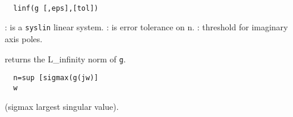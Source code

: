 \begin{mandesc}
   \\ %
\end{mandesc}
\begin{calling_sequence}
\begin{verbatim}
  linf(g [,eps],[tol])   
\end{verbatim}
\end{calling_sequence}
\begin{parameters}
  \begin{varlist}
    : is a \verb!syslin! linear system.
    : is error tolerance on n.
    : threshold for imaginary axis poles.
  \end{varlist}
\end{parameters}
\begin{mandescription}
  returns the L\_infinity norm of \verb!g!.
\begin{verbatim}
  n=sup [sigmax(g(jw)] 
  w
\end{verbatim}
(sigmax largest singular value).
\end{mandescription}
\begin{manseealso}
     
\end{manseealso}
